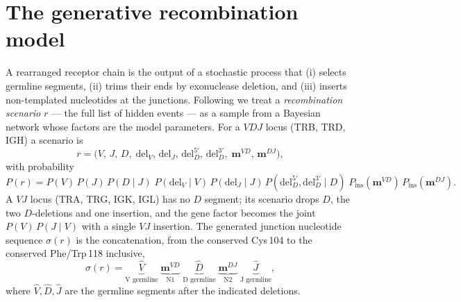\documentclass[11pt]{article}
\theoremstyle{oldplain}
\theoremstyle{oldrem}
\newcommand{\ins}{\mathrm{ins}}
\newcommand{\del}{\mathrm{del}}
\begin{document}
\section{The generative recombination model}\label{sec:model}

A rearranged receptor chain is the output of a stochastic process that (i) selects germline segments,
(ii) trims their ends by exonuclease deletion, and (iii) inserts non-templated nucleotides at the
junctions. Following \cite{Murugan2012,Marcou2018} we treat a \emph{recombination scenario} $r$ --- the
full list of hidden events --- as a sample from a Bayesian network whose factors are the model
parameters. For a $VDJ$ locus (TRB, TRD, IGH) a scenario is
\begin{equation}\label{eq:scenario}
  r=\bigl(V,\,J,\,D,\;\del_V,\,\del_J,\,\del_D^{5'},\,\del_D^{3'},\;\mathbf{m}^{VD},\,\mathbf{m}^{DJ}\bigr),
\end{equation}
with probability
\begin{equation}\label{eq:pvdj}
  P(r)=P(V)\,P(J)\,P(D\mid J)\;
       P(\del_V\!\mid V)\,P(\del_J\!\mid J)\,P(\del_D^{5'},\del_D^{3'}\!\mid D)\;
       P_{\ins}(\mathbf{m}^{VD})\,P_{\ins}(\mathbf{m}^{DJ}).
\end{equation}
A $VJ$ locus (TRA, TRG, IGK, IGL) has no $D$ segment; its scenario drops $D$, the two $D$-deletions and
one insertion, and the gene factor becomes the joint $P(V)\,P(J\mid V)$ with a single $VJ$ insertion.
The generated junction nucleotide sequence $\sigma(r)$ is the concatenation, from the conserved Cys\,104 to
the conserved Phe/Trp\,118 inclusive,
\begin{equation}\label{eq:concat}
  \sigma(r)=\underbrace{\hat V}_{\text{V germline}}\;
            \underbrace{\mathbf{m}^{VD}}_{\text{N1}}\;
            \underbrace{\hat D}_{\text{D germline}}\;
            \underbrace{\mathbf{m}^{DJ}}_{\text{N2}}\;
            \underbrace{\hat J}_{\text{J germline}},
\end{equation}
where $\hat V,\hat D,\hat J$ are the germline segments after the indicated deletions.
\end{document}
